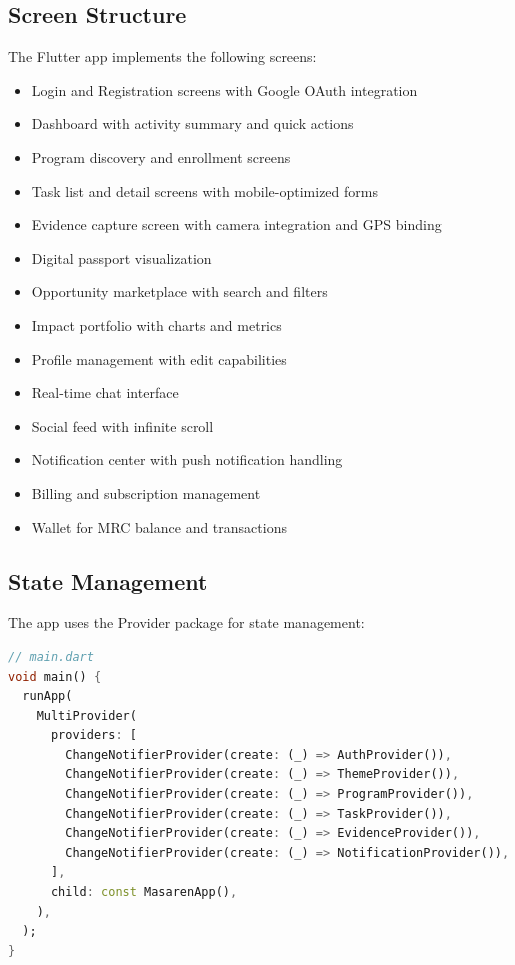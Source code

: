 \documentclass[11pt,a4paper]{article}
\begin{document}
\subsection{Screen Structure}

The Flutter app implements the following screens:
\begin{itemize}
  \item Login and Registration screens with Google OAuth integration
  \item Dashboard with activity summary and quick actions
  \item Program discovery and enrollment screens
  \item Task list and detail screens with mobile-optimized forms
  \item Evidence capture screen with camera integration and GPS binding
  \item Digital passport visualization
  \item Opportunity marketplace with search and filters
  \item Impact portfolio with charts and metrics
  \item Profile management with edit capabilities
  \item Real-time chat interface
  \item Social feed with infinite scroll
  \item Notification center with push notification handling
  \item Billing and subscription management
  \item Wallet for MRC balance and transactions
\end{itemize}

\subsection{State Management}

The app uses the Provider package for state management:

\begin{lstlisting}[language=Dart, caption=Provider Setup]
// main.dart
void main() {
  runApp(
    MultiProvider(
      providers: [
        ChangeNotifierProvider(create: (_) => AuthProvider()),
        ChangeNotifierProvider(create: (_) => ThemeProvider()),
        ChangeNotifierProvider(create: (_) => ProgramProvider()),
        ChangeNotifierProvider(create: (_) => TaskProvider()),
        ChangeNotifierProvider(create: (_) => EvidenceProvider()),
        ChangeNotifierProvider(create: (_) => NotificationProvider()),
      ],
      child: const MasarenApp(),
    ),
  );
}
\end{lstlisting}
\end{document}
